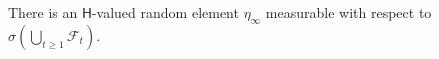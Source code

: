 There is an \(\mathsf H\)-valued random element \(\eta_\infty\) measurable with respect to \(\sigma(\bigcup_{t\ge1}\mathcal F_t)\).